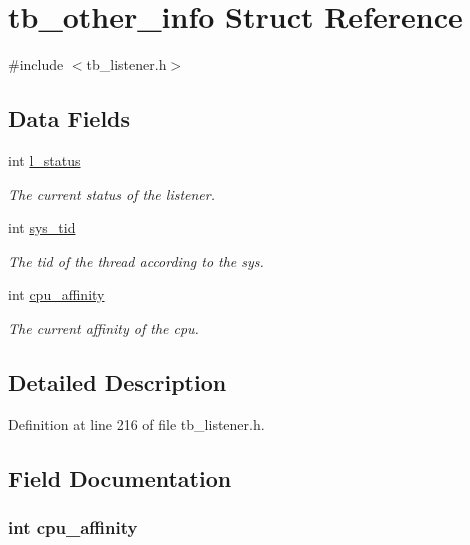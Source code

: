 \hypertarget{structtb__other__info}{\section{tb\-\_\-other\-\_\-info Struct Reference}
\label{structtb__other__info}
}


{\ttfamily \#include $<$tb\-\_\-listener.\-h$>$}

\subsection*{Data Fields}
\begin{DoxyCompactItemize}
\item 
int \hyperlink{structtb__other__info_a35fe7496a6493a097350d748cf5d8908}{l\-\_\-status}
\begin{DoxyCompactList}\small\item\em The current status of the listener. \end{DoxyCompactList}\item 
int \hyperlink{structtb__other__info_a053be2f9198a10c7329b11c19dfc6fe4}{sys\-\_\-tid}
\begin{DoxyCompactList}\small\item\em The tid of the thread according to the sys. \end{DoxyCompactList}\item 
int \hyperlink{structtb__other__info_ab7a892d2900125821f3d6b11d003191b}{cpu\-\_\-affinity}
\begin{DoxyCompactList}\small\item\em The current affinity of the cpu. \end{DoxyCompactList}\end{DoxyCompactItemize}


\subsection{Detailed Description}


Definition at line 216 of file tb\-\_\-listener.\-h.



\subsection{Field Documentation}
\hypertarget{structtb__other__info_ab7a892d2900125821f3d6b11d003191b}{
\subsubsection[{cpu\-\_\-affinity}]{\setlength{\rightskip}{0pt plus 5cm}int cpu\-\_\-affinity}}\label{structtb__other__info_ab7a892d2900125821f3d6b11d003191b}


